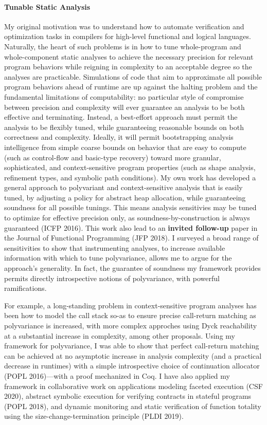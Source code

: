 \documentclass[12pt]{article}
\begin{document}
\paragraph*{Tunable Static Analysis}
%
My original motivation was to understand how to automate verification and optimization tasks in compilers for high-level functional and logical languages. Naturally, the heart of such problems is in how to tune whole-program and whole-component static analyses to achieve the necessary precision for relevant program behaviors while reigning in complexity to an acceptable degree so the analyses are practicable. Simulations of code that aim to approximate all possible program behaviors ahead of runtime are up against the halting problem and the fundamental limitations of computability: no particular style of compromise between precision and complexity will ever guarantee an analysis to be both effective and terminating. Instead, a best-effort approach must permit the analysis to be flexibly tuned, while guaranteeing reasonable bounds on both correctness and complexity. Ideally, it will permit bootstrapping analysis intelligence from simple coarse bounds on behavior that are easy to compute (such as control-flow and basic-type recovery) toward more granular, sophisticated, and context-sensitive program properties (such as shape analysis, refinement types, and symbolic path conditions). My own work has developed a general approach to polyvariant and context-sensitive analysis that is easily tuned, by adjusting a policy for abstract heap allocation, while guaranteeing soundness for all possible tunings. This means analysis sensitivies may be tuned to optimize for effective precision only, as soundness-by-construction is always guaranteed (ICFP 2016). This work also lead to an \textbf{invited follow-up} paper in the Journal of Functional Programming (JFP 2018). I surveyed a broad range of sensitivities to show that instrumenting analyses, to increase available information with which to tune polyvariance, allows me to argue for the approach's generality. In fact, the guarantee of soundness my framework provides permits directly introspective notions of polyvariance, with powerful ramifications.

For example, a long-standing problem in context-sensitive program analyses has been how to model the call stack so-as to ensure precise call-return matching as polyvariance is increased, with more complex approches using Dyck reachability at a substantial increase in complexity, among other proposals. Using my framework for polyvariance, I was able to show that perfect call-return matching can be achieved at no asymptotic increase in analysis complexity (and a practical decrease in runtimes) with a simple introspective choice of continuation allocator (POPL 2016)---with a proof mechanized in Coq. I have also applied my framework in collaborative work on applications modeling faceted execution (CSF 2020), abstract symbolic execution for verifying contracts in stateful programs (POPL 2018), and dynamic monitoring and static verification of function totality using the size-change-termination principle (PLDI 2019).    
\end{document}
